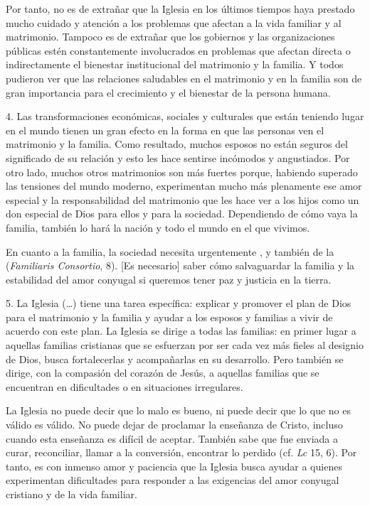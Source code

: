 \begin{body}
\begin{body}
		Por tanto, no es de extrañar que la Iglesia en los últimos tiempos haya prestado mucho cuidado y atención a los problemas que afectan a la vida familiar y al matrimonio. Tampoco es de extrañar que los gobiernos y las organizaciones públicas estén constantemente involucrados en problemas que afectan directa o indirectamente el bienestar institucional del matrimonio y la familia. Y todos pudieron ver que las relaciones saludables en el matrimonio y en la familia son de gran importancia para el crecimiento y el bienestar de la persona humana.

		4. Las transformaciones económicas, sociales y culturales que están teniendo lugar en el mundo tienen un gran efecto en la forma en que las personas ven el matrimonio y la familia. Como resultado, muchos esposos no están seguros del significado de su relación y esto les hace sentirse incómodos y angustiados. Por otro lado, muchos otros matrimonios son más fuertes porque, habiendo superado las tensiones del mundo moderno, experimentan mucho más plenamente ese amor especial y la responsabilidad del matrimonio que les hace ver a los hijos como un don especial de Dios para ellos y para la sociedad. Dependiendo de cómo vaya la familia, también lo hará la nación y todo el mundo en el que vivimos.

		En cuanto a la familia, la sociedad necesita urgentemente , y también de la  (\emph{Familiaris Consortio}, 8). {[}Es necesario{]} saber cómo salvaguardar la familia y la estabilidad del amor conyugal si queremos tener paz y justicia en la tierra.

		5. La Iglesia (\ldots{}) tiene una tarea específica: explicar y promover el plan de Dios para el matrimonio y la familia y ayudar a los esposos y familias a vivir de acuerdo con este plan. La Iglesia se dirige a todas las familias: en primer lugar a aquellas familias cristianas que se esfuerzan por ser cada vez más fieles al designio de Dios, busca fortalecerlas y acompañarlas en su desarrollo. Pero también se dirige, con la compasión del corazón de Jesús, a aquellas familias que se encuentran en dificultades o en situaciones irregulares.

		La Iglesia no puede decir que lo malo es bueno, ni puede decir que lo que no es válido es válido. No puede dejar de proclamar la enseñanza de Cristo, incluso cuando esta enseñanza es difícil de aceptar. También sabe que fue enviada a curar, reconciliar, llamar a la conversión, encontrar lo perdido (cf. \emph{Lc} 15, 6). Por tanto, es con inmenso amor y paciencia que la Iglesia busca ayudar a quienes experimentan dificultades para responder a las exigencias del amor conyugal cristiano y de la vida familiar.


\end{body}
\end{body}
